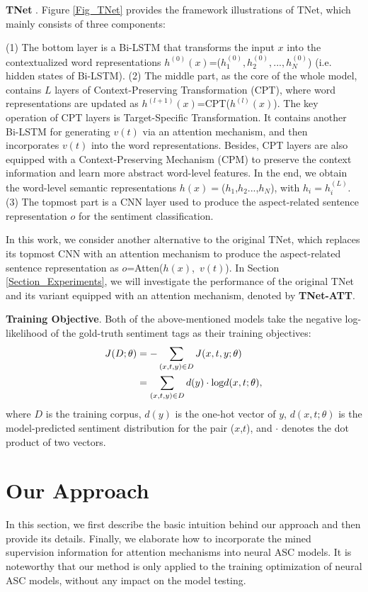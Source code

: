 \documentclass[11pt,a4paper]{article}
\begin{document}
\textbf{TNet} \cite{Li:ACL2018}.
Figure \ref{Fig_TNet} provides the framework illustrations of TNet,
which mainly consists of three components:

(1) The bottom layer is a
Bi-LSTM that transforms the input $x$ into the contextualized word representations $h^{(0)}(x)$=($h_1^{(0)},h_2^{(0)},...,h_N^{(0)}$) (i.e. hidden states of Bi-LSTM).
(2) The middle part, as the core of the whole model,
contains $L$ layers of Context-Preserving Transformation (CPT),
where word representations are updated as $h^{(l+1)}(x)$=CPT($h^{(l)}(x)$).
The key operation of CPT layers is Target-Specific Transformation.
It contains another Bi-LSTM for generating $v(t)$ via an attention mechanism,
and then incorporates $v(t)$ into the word representations.
Besides,
CPT layers are also equipped with a Context-Preserving Mechanism (CPM) to
preserve the context information and learn more abstract word-level features.
In the end,
we obtain the word-level semantic representations $h(x)$$=$($h_1$,$h_2$...,$h_N$), 
with $h_i$$=$$h^{(L)}_i$.
(3) The topmost part is a CNN layer used to produce the aspect-related sentence representation $o$ for the sentiment classification.

In this work,
we consider another alternative to the original TNet,
which replaces its topmost CNN with an attention mechanism to produce the aspect-related sentence representation as $o$=Atten($h(x)$,\ $v(t)$).
In Section \ref{Section_Experiments},
we will investigate the performance of
the original TNet and its variant equipped with an attention mechanism,
denoted by \textbf{TNet-ATT}.


\textbf{Training Objective}.
Both of the above-mentioned models take the negative log-likelihood of the gold-truth sentiment tags as their training objectives:
\begin{align}\label{Eqa_OldTrainingObjective}
J(D;\theta) &= -\sum_{(x,t,y)\in D} J(x,t,y;\theta) \notag \\
            &=\sum_{(x,t,y)\in D} d(y) \cdot \textrm{log}d(x,t; \theta),
\end{align}where $D$ is the training corpus,
$d(y)$ is the one-hot vector of $y$,
$d(x,t;\theta)$ is the model-predicted sentiment distribution for the pair ($x$,$t$),
and $\cdot$ denotes the dot product of two vectors.




\section{Our Approach}\label{Section_OurApproach}
In this section,
we first describe the basic intuition behind our approach and then provide its details.
Finally,
we elaborate how to incorporate the mined supervision information for attention mechanisms into neural ASC models.
It is noteworthy that our method is only applied to the training optimization of neural ASC models,
without any impact on the model testing.
\end{document}

